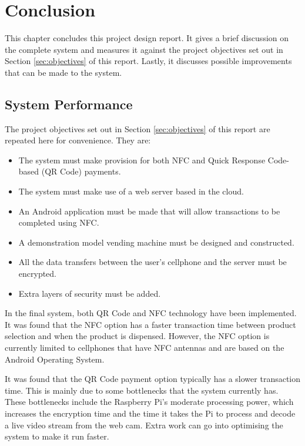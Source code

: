 \chapter{Conclusion}
\label{chap:7}

This chapter concludes this project design report. It gives a brief discussion on the
complete system and measures it against the project objectives set out in Section
\ref{sec:objectives} of this report. Lastly, it discusses possible improvements that can
be made to the system. 

\section{System Performance}

The project objectives set out in Section \ref{sec:objectives} of this report are repeated
here for convenience. They are:

\begin{itemize}
  \item The system must make provision for both NFC and Quick Response Code-based (QR
  Code) payments.
  \item The system must make use of a web server based in the cloud.
  \item An Android application must be made that will allow transactions to be completed
  using NFC.
  \item A demonstration model vending machine must be designed and constructed.
  \item All the data transfers between the user's cellphone and the server must be
  encrypted.
  \item Extra layers of security must be added. 
\end{itemize}

In the final system, both QR Code and NFC technology have been implemented. It was found
that the NFC option has a faster transaction time between product selection and
when the product is dispensed.
However, the NFC option is currently limited to cellphones that have NFC antennas and are
based on the Android Operating System.

It was found that the QR Code payment option typically has a slower transaction time. This
is mainly due to some bottlenecks that the system currently has. These bottlenecks include
the Raspberry Pi's moderate processing power, which increases the encryption time and the
time it takes the Pi to process and decode a live video stream from the web cam. Extra
work can go into optimising the system to make it run faster.

